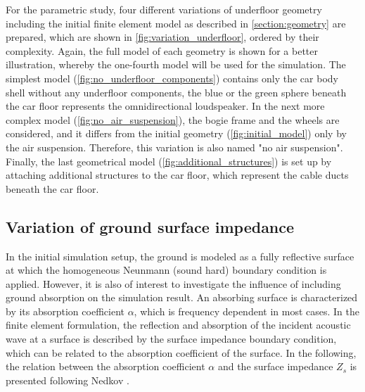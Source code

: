 For the parametric study, four different variations of underfloor geometry including the initial finite element model as described in \cref{section:geometry} are prepared, which are shown in \cref{fig:variation_underfloor}, ordered by their complexity. Again, the full model of each geometry is shown for a better illustration, whereby the one-fourth model will be used for the simulation. The simplest model (\cref{fig:no_underfloor_components}) contains only the car body shell without any underfloor components, the blue or the green sphere beneath the car floor represents the omnidirectional loudspeaker. In the next more complex model (\cref{fig:no_air_suspension}), the bogie frame and the wheels are considered, and it differs from the initial geometry (\cref{fig:initial_model}) only by the air suspension. Therefore, this variation is also named "no air suspension". Finally, the last geometrical model (\cref{fig:additional_structures}) is set up by attaching additional structures to the car floor, which represent the cable ducts beneath the car floor.

\newpage
\subsection{Variation of ground surface impedance}

In the initial simulation setup, the ground is modeled as a fully reflective surface at which the homogeneous Neunmann (sound hard) boundary condition is applied.
However, it is also of interest to investigate the influence of including ground absorption on the simulation result.
An absorbing surface is characterized by its absorption coefficient $\alpha$, which is frequency dependent in most cases.
In the finite element formulation, the reflection and absorption of the incident acoustic wave at a surface is described by the surface impedance boundary condition, which can be related to the absorption coefficient of the surface. In the following, the relation between the absorption coefficient $\alpha$ and the surface impedance $Z_s$ is presented following Nedkov \cite{nedkov_impedance_2011}.

